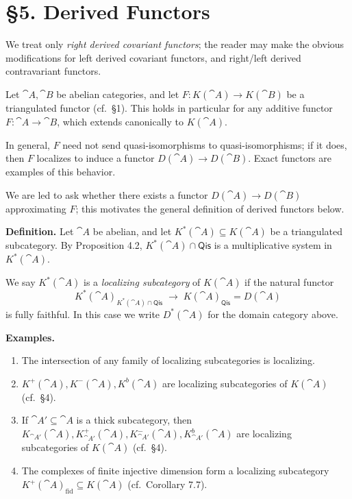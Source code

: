\setcounter{page}{49}
\section{\S5. Derived Functors}

We treat only \textit{right derived covariant functors}; the reader may make the obvious modifications for left derived covariant functors, and right/left derived contravariant functors.

Let \(\cat{A},\cat{B}\) be abelian categories, and let \(F\colon K(\cat{A})\to K(\cat{B})\) be a triangulated functor (cf.\ \S1). This holds in particular for any additive functor \(F\colon\cat{A}\to\cat{B}\), which extends canonically to \(K(\cat{A})\).

In general, \(F\) need not send quasi-isomorphisms to quasi-isomorphisms; if it does, then \(F\) localizes to induce a functor \(D(\cat{A})\to D(\cat{B})\). Exact functors are examples of this behavior.

We are led to ask whether there exists a functor \(D(\cat{A})\to D(\cat{B})\) approximating \(F\); this motivates the general definition of derived functors below.

\medskip
\textbf{Definition.}
Let \(\cat{A}\) be abelian, and let \(K^*(\cat{A})\subseteq K(\cat{A})\) be a triangulated subcategory. By Proposition 4.2, \(K^*(\cat{A})\cap\mathsf{Qis}\) is a multiplicative system in \(K^*(\cat{A})\).

We say \(K^*(\cat{A})\) is a \textit{localizing subcategory} of \(K(\cat{A})\) if the natural functor
\[
K^*(\cat{A})_{K^*(\cat{A})\cap\mathsf{Qis}}
\;\to\;
K(\cat{A})_{\mathsf{Qis}} = D(\cat{A})
\]
is fully faithful. In this case we write \(D^*(\cat{A})\) for the domain category above.

\setcounter{page}{50}
\textbf{Examples.}
\begin{enumerate}
\item The intersection of any family of localizing subcategories is localizing.
\item \(K^+(\cat{A}),K^-(\cat{A}),K^b(\cat{A})\) are localizing subcategories of \(K(\cat{A})\) (cf.\ \S4).
\item If \(\cat{A}'\subseteq\cat{A}\) is a thick subcategory, then \(K_{\cat{A}'}(\cat{A}),K_{\cat{A}'}^+(\cat{A}),K_{\cat{A}'}^-(\cat{A}),K_{\cat{A}'}^b(\cat{A})\) are localizing subcategories of \(K(\cat{A})\) (cf.\ \S4).
\item The complexes of finite injective dimension form a localizing subcategory \(K^+(\cat{A})_{\mathrm{fid}}\subseteq K(\cat{A})\) (cf.\ Corollary 7.7).
\end{enumerate}

